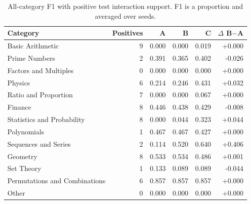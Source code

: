 \begin{table}[htbp]\centering\small
\caption{All-category F1 with positive test interaction support. F1 is a proportion and averaged over seeds.}\label{tab:categories}
\begin{tabular}{@{}lrrrrr@{}}\toprule
Category & Positives & A & B & C & $\Delta$ B$-$A\\\midrule
Basic Arithmetic & 9 & 0.000 & 0.000 & 0.019 & +0.000\\
Prime Numbers & 2 & 0.391 & 0.365 & 0.402 & -0.026\\
Factors and Multiples & 0 & 0.000 & 0.000 & 0.000 & +0.000\\
Physics & 6 & 0.214 & 0.246 & 0.431 & +0.032\\
Ratio and Proportion & 7 & 0.000 & 0.000 & 0.067 & +0.000\\
Finance & 8 & 0.446 & 0.438 & 0.429 & -0.008\\
Statistics and Probability & 8 & 0.000 & 0.044 & 0.323 & +0.044\\
Polynomials & 1 & 0.467 & 0.467 & 0.427 & +0.000\\
Sequences and Series & 2 & 0.114 & 0.520 & 0.640 & +0.406\\
Geometry & 8 & 0.533 & 0.534 & 0.486 & +0.001\\
Set Theory & 1 & 0.133 & 0.089 & 0.089 & -0.044\\
Permutations and Combinations & 6 & 0.857 & 0.857 & 0.857 & +0.000\\
Other & 0 & 0.000 & 0.000 & 0.000 & +0.000\\
\bottomrule\end{tabular}\end{table}

